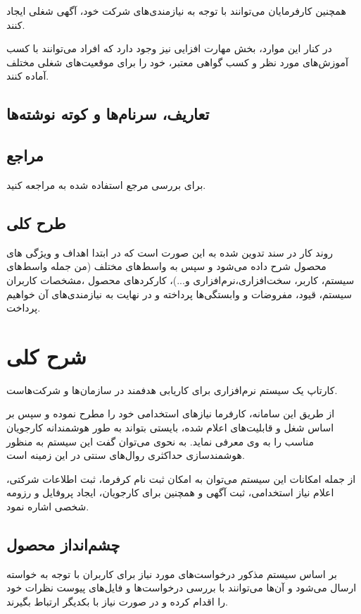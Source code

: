 \documentclass{report}
\begin{document}
				همچنین کارفرمایان می‌توانند با توجه به نیازمندی‌های شرکت خود، آگهی شغلی ایجاد کنند.
				
				در کنار این موارد، بخش مهارت افزایی نیز وجود دارد که افراد می‌توانند با کسب آموزش‌های مورد نظر و کسب گواهی معتبر، خود را برای موقعیت‌های شغلی مختلف آماده کنند.

			\subsection{تعاریف، سرنام‌ها و کوته نوشته‌ها}
			\subsection{مراجع}
				برای بررسی مرجع استفاده شده به 
				\cite{kung2013object}
				مراجعه کنید.
			\subsection{طرح کلی}
				روند کار در سند تدوین شده به این صورت است که در ابتدا اهداف و ویژگی های محصول شرح داده می‌شود و سپس به واسط‌های مختلف (من جمله واسط‌های سیستم، کاربر، سخت‌افزاری،نرم‌افزاری و...)، کارکردهای محصول ،مشخصات کاربران سیستم، قیود، مفروضات و وابستگی‌ها پرداخته و در نهایت به نیازمندی‌های آن خواهیم پرداخت.  
				
		\section{شرح کلی}
			کارتاپ یک سیستم نرم‌افزاری برای کاریابی هدفمند در سازمان‌ها و شرکت‌هاست.
			
			از طریق این سامانه، کارفرما نیاز‌های استخدامی خود را مطرح نموده و سپس بر اساس شغل و قابلیت‌های اعلام شده، بایستی بتواند به طور هوشمندانه کارجویان مناسب را به وی معرفی نماید. به نحوی می‌توان گفت این سیستم به منظور هوشمندسازی حداکثری روال‌های سنتی در این زمینه است.
			
			از جمله امکانات این سیستم می‌توان به امکان ثبت نام کرفرما، ثبت اطلاعات شرکتی، اعلام نیاز استخدامی، ثبت آگهی و همچنین برای کارجویان، ایجاد پروفایل و رزومه شخصی اشاره نمود.
			
			\subsection{چشم‌انداز محصول}
				بر اساس سیستم مذکور درخواست‌های مورد نیاز برای کاربران با توجه به خواسته ارسال می‌شود و آن‌ها می‌توانند با بررسی درخواست‌ها و فایل‌های پیوست نظرات خود را اقدام کرده و در صورت نیاز با بکدیگر ارتباط بگیرند.
				
\end{document}
